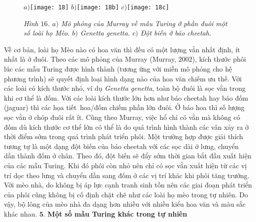 \begin{multicols}{2}
\begin{figure}[H]
	\end{figure}
	\begin{figure}[H]
		\vspace*{5pt}
		\centering
		\captionsetup{labelformat= empty, justification=centering}
		$a)$\texttt{[image: 18]}
		$b)$\texttt{[image: 18b]}
		$c)$\texttt{[image: 18c]}
		\caption{\small\textit{\color{timhieukhoahoc}Hình $16$. $a)$ Mô phỏng của Murray về mẫu Turing ở phần đuôi một số loài họ Mèo. $b)$ Genetta genetta.  $c)$ Đột biến ở báo cheetah.}}
		\vspace*{-10pt}
	\end{figure}
	Về cơ bản, loài họ Mèo nào có hoa văn thì đều có một lượng vằn nhất định, ít nhất là ở đuôi. Theo các mô phỏng của Murray (Murray, $2002$), kích thước phôi lúc các mẫu Turing được hình thành (tương ứng với miền mô phỏng cho hệ phương trình) sẽ quyết định loại hình dạng nào của hoa văn chiếm ưu thế. Với các loài có kích thước nhỏ, ví dụ \textit{Genetta genetta}, toàn bộ đuôi là sọc vằn trong khi cơ thể là đốm. Với các loài kích thước lớn hơn như báo cheetah hay báo đốm (jaguar) thì các họa tiết \,hoa/đốm chiếm phần lớn đuôi. Ở báo hoa thì số lượng sọc vằn ở chóp đuôi rất ít. Cũng theo Murray, việc hổ chỉ có vằn mà không có đốm dù kích thước cơ thể lớn có thể là do quá trình hình thành các vân xảy ra ở thời điểm sớm trong quá trình phát triển phôi. Một trường hợp được giải thích tương tự là một dạng đột biến của báo cheetah với các sọc dài ở lưng, chuyển dần thành đốm ở chân. Theo đó, đột biến sẽ đẩy sớm thời gian bắt đầu xuất hiện của các mẫu Turing. Khi đó phôi còn nhỏ nên chỉ có sọc vằn xuất hiện từ các vị trí dọc theo lưng và chuyển dần sang đốm ở các vị trí khác khi phôi tăng trưởng. Với mèo nhà, do không bị áp lực cạnh tranh sinh tồn nên các giai đoạn phát triển của phôi cũng không bị cố định chặt chẽ như các loài họ mèo trong tự nhiên. Do vậy, bộ lông của mèo nhà đa dạng hơn nhiều với nhiều kiểu hoa văn và màu sắc khác nhau.
	\vskip 0.2cm
	\vskip 0.2cm
	$\pmb{5.}$ \textbf{\color{timhieukhoahoc}Một số mẫu Turing khác trong tự nhiên}

\end{multicols}
